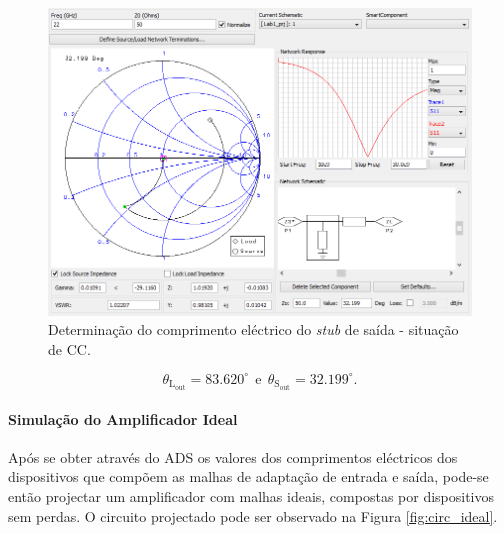 \documentclass[11pt]{article}
\numberwithin{equation}{section}
\begin{document}
\begin{figure}[H]
	\centering
	\includegraphics[keepaspectratio=true, scale=0.45]{exps/Carga_CC_stub}
	\vspace{-0.5em}
	\caption{Determinação do comprimento eléctrico do \textit{stub} de saída - situação de CC.}
	\vspace{-0.8em}
\end{figure}

\vspace{-3mm}
\begin{equation}
\theta_{\text{L}_{\text{out}}} = 83.620^{\circ}  ~~ \text{e} ~~ \theta_{\text{S}_{\text{out}}} = 32.199^{\circ}.
\end{equation}

\vspace{1mm} 

\paragraph{Simulação do Amplificador Ideal} \hspace{0pt}  

Após se obter através do ADS os valores dos comprimentos eléctricos dos dispositivos que compõem as malhas de adaptação de entrada e saída, pode-se então projectar um amplificador com malhas ideais, compostas por dispositivos sem perdas. O circuito projectado pode ser observado na Figura \ref{fig:circ_ideal}.
\end{document}
